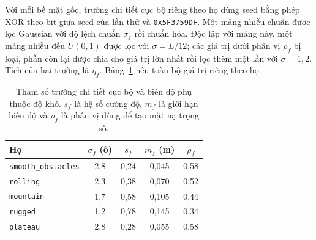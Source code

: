 \documentclass[11pt]{article}
\begin{document}
Với mỗi bề mặt gốc, trường chi tiết cục bộ riêng theo họ dùng seed bằng phép XOR
theo bit giữa seed của lần thử và \texttt{0x5F3759DF}. Một mảng nhiễu chuẩn được
lọc Gaussian với độ lệch chuẩn $\sigma_f$ rồi chuẩn hóa. Độc lập với mảng này,
một mảng nhiễu đều $U(0,1)$ được lọc với $\sigma=L/12$; các giá trị dưới phân vị
$\rho_f$ bị loại, phần còn lại được chia cho giá trị lớn nhất rồi lọc thêm một lần
với $\sigma=1{,}2$. Tích của hai trường là $\eta_f$.
Bảng~\ref{tab:detail-parameters} nêu toàn bộ giá trị riêng theo họ.

\begin{table}[htbp]
  \centering
  \caption{Tham số trường chi tiết cục bộ và biên độ phụ thuộc độ khó. $s_f$ là
  hệ số cường độ, $m_f$ là giới hạn biên độ và $\rho_f$ là phân vị dùng để tạo
  mặt nạ trọng số.}
  \label{tab:detail-parameters}
  \small
  \begin{tabular}{lcccc}
    \toprule
    Họ & $\sigma_f$ (ô) & $s_f$ & $m_f$ (m) & $\rho_f$ \\
    \midrule
    \texttt{smooth\_obstacles} & 2,8 & 0,24 & 0,045 & 0,58 \\
    \texttt{rolling}           & 2,3 & 0,38 & 0,070 & 0,52 \\
    \texttt{mountain}          & 1,7 & 0,58 & 0,105 & 0,44 \\
    \texttt{rugged}            & 1,2 & 0,78 & 0,145 & 0,34 \\
    \texttt{plateau}           & 2,8 & 0,28 & 0,055 & 0,58 \\
    \bottomrule
  \end{tabular}
\end{table}
\end{document}
